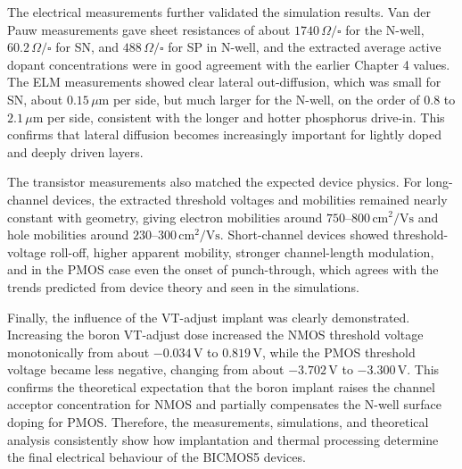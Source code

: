 The electrical measurements further validated the simulation results. Van der Pauw measurements gave sheet resistances of about $1740\,\Omega/\square$ for the N-well, $60.2\,\Omega/\square$ for SN, and $488\,\Omega/\square$ for SP in N-well, and the extracted average active dopant concentrations were in good agreement with the earlier Chapter 4 values. The ELM measurements showed clear lateral out-diffusion, which was small for SN, about $0.15\,\mu\text{m}$ per side, but much larger for the N-well, on the order of $0.8$ to $2.1\,\mu\text{m}$ per side, consistent with the longer and hotter phosphorus drive-in. This confirms that lateral diffusion becomes increasingly important for lightly doped and deeply driven layers.

The transistor measurements also matched the expected device physics. For long-channel devices, the extracted threshold voltages and mobilities remained nearly constant with geometry, giving electron mobilities around $750$--$800\,\text{cm}^2/\text{Vs}$ and hole mobilities around $230$--$300\,\text{cm}^2/\text{Vs}$. Short-channel devices showed threshold-voltage roll-off, higher apparent mobility, stronger channel-length modulation, and in the PMOS case even the onset of punch-through, which agrees with the trends predicted from device theory and seen in the simulations.

Finally, the influence of the VT-adjust implant was clearly demonstrated. Increasing the boron VT-adjust dose increased the NMOS threshold voltage monotonically from about $-0.034\,\text{V}$ to $0.819\,\text{V}$, while the PMOS threshold voltage became less negative, changing from about $-3.702\,\text{V}$ to $-3.300\,\text{V}$. This confirms the theoretical expectation that the boron implant raises the channel acceptor concentration for NMOS and partially compensates the N-well surface doping for PMOS. Therefore, the measurements, simulations, and theoretical analysis consistently show how implantation and thermal processing determine the final electrical behaviour of the BICMOS5 devices.